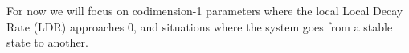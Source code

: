 %

For now we will focus on codimension-1 parameters where the local Local Decay Rate (LDR) approaches 0, and situations where the system goes from a stable state to another. 












%
%





%



